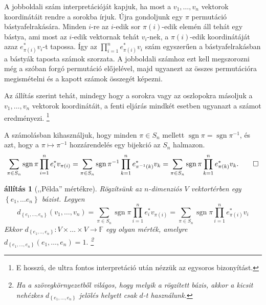 \documentclass[a4paper, showtrims]{memoir}
\makeatletter
\renewenvironment{proof}[1][\proofname]
    {\par\pushQED{\qed}%
    \normalfont \topsep6\p@\@plus6\p@\relax
    \trivlist
    \item[\hskip\labelsep
        \itshape
    #1\@addpunct{:}]\ignorespaces}
    {\popQED\endtrivlist\@endpefalse}
\theoremstyle{plain}
\newtheorem{proposition}{állítás}[chapter]
\theoremstyle{remark}
\theoremstyle{definition}
\DeclareMathOperator{\sgn}{sgn}
\makeatother
\begin{document}
A jobboldali szám interpretációját kapjuk, ha most a $v_1,\ldots,v_n$ vektorok koordinátáit rendre a sorokba írjuk.
Újra gondoljunk egy $\pi$ permutáció bástyafelrakására.
Minden $i$-re az $i$-edik sor $\pi\left( i \right)$-edik elemén áll tehát egy bástya,
ami most az $i$-edik vektornak tehát $v_i$-nek, a $\pi\left( i \right)$-edik koordinátáját azaz $e_{\pi(i)}^\ast v_i$-t tapossa.
Így az $\prod_{i=1}^n e_{\pi(i)}^\ast v_i$ szám egyszerűen a bástyafelrakásban a bástyák taposta számok szorzata.
A jobboldali számhoz ezt kell megszorozni még a szóban forgó permutáció előjelével,
majd ugyanezt az összes permutációra megismételni és a kapott számok összegét képezni.

Az állítás szerint tehát, mindegy hogy a sorokra vagy az oszlopokra másoljuk a $v_1,\ldots,v_n$ vektorok koordinátáit,
a fenti eljárás mindkét esetben ugyanazt a számot eredményezi.
\footnote{
	E hosszú, de ultra fontos interpretáció után nézzük az egysoros bizonyítást.
}
\begin{proof}
	A számolásban kihasználjuk, hogy minden $\pi\in S_n$ mellett $\sgn\pi=\sgn\pi^{-1}$,
	és azt, hogy a $\pi \mapsto \pi ^{-1}$ hozzárendelés egy bijekció az $S_{n}$ halmazon.
	\[
		\sum_{\pi \in S_{n}}\operatorname{sgn}\pi \prod_{i=1}^{n}e_{i}^{\ast }v_{\pi
		\left( i\right) }=\sum_{\pi \in S_{n}}\operatorname{sgn}\pi
		^{-1}\prod_{k=1}^{n}e_{\pi ^{-1}\left( k\right) }^{\ast }v_{k}=\sum_{\pi \in
			S_{n}}\operatorname{sgn}\pi \prod_{k=1}^{n}e_{\pi \left( k\right) }^{\ast }v_{k}.\qedhere
	\]
\end{proof}

\begin{proposition}[,,Példa'' mértékre]
	Rögzítsünk az $n$-dimenziós $V$ vektortérben egy $\left\{ e_{1},\ldots e_{n}\right\} $ bázist.
    Legyen
	\[
		d_{\left\{ e_1,\ldots,e_n \right\}}\left( v_1,\ldots,v_n \right)=
		\sum_{\pi \in S_{n}}\sgn\pi\prod_{i=1}^{n}e_{i}^{\ast }v_{\pi \left( i\right)}
		=
		\sum_{\pi \in S_{n}}\sgn\pi\prod_{i=1}^{n}e_{\pi \left( i\right)}^{\ast }v_{i}
	\]
	Ekkor $d_{\left\{ e_1,..,e_n \right\}}:V\times \ldots \times V\rightarrow \mathbb{F}$ egy olyan mérték,
	amelyre $d_{\left\{ e_1,\ldots,e_n \right\}}\left( e_{1},\ldots ,e_{n}\right) =1.$
	\footnote{
		Ha a szövegkörnyezetből világos,
		hogy melyik a rögzített bázis,
		akkor a kicsit nehézkes $d_{\left\{ e_1,\ldots,e_n \right\}}$ jelölés helyett csak $d$-t használunk.
	}
\end{proposition}
\end{document}
